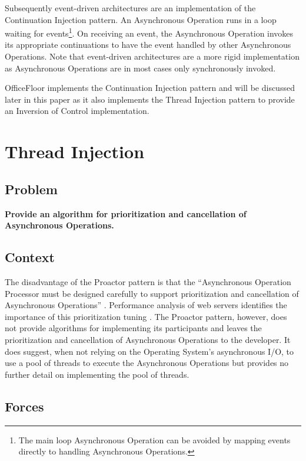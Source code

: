 \documentclass[prodmode]{style/acmlarge}
\begin{document}
Subsequently event-driven architectures are an implementation of the
Continuation Injection pattern.  An Asynchronous Operation runs in a loop
waiting for events\footnote{The main loop Asynchronous Operation can be avoided
by mapping events directly to handling Asynchronous Operations.}.  On receiving
an event, the Asynchronous Operation invokes its appropriate continuations to
have the event handled by other Asynchronous Operations.  Note that event-driven
architectures are a more rigid implementation as Asynchronous Operations are in
most cases only synchronously invoked.

OfficeFloor \cite{officefloor} implements the Continuation Injection pattern and
will be discussed later in this paper as it also implements the Thread Injection
pattern to provide an Inversion of Control implementation.



\section{Thread Injection}


\subsection{Problem}

\textbf{Provide an algorithm for prioritization and cancellation of Asynchronous Operations.}


\subsection{Context}

The disadvantage of the Proactor pattern is that the ``Asynchronous Operation
Processor must be designed carefully to support prioritization and cancellation
of Asynchronous Operations'' \cite[p. 8]{proactor}.  Performance analysis of web
servers identifies the importance of this prioritization tuning
\cite{tuning-important,low-server-footprint,tuning-os-important}. The Proactor
pattern, however, does not provide algorithms for implementing its participants
and leaves the prioritization and cancellation of Asynchronous Operations to the
developer.  It does suggest, when not relying on the Operating System's
asynchronous I/O, to use a pool of threads to execute the Asynchronous
Operations but provides no further detail on implementing the pool of threads.


\subsection{Forces}
\end{document}
